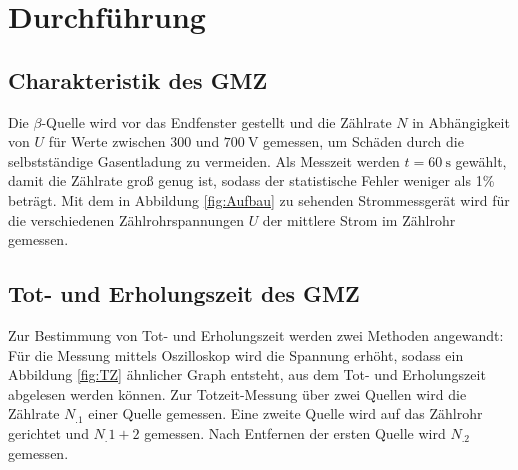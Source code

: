 \section{Durchführung}
\label{sec:Durchführung}

\subsection{Charakteristik des GMZ}
Die $\beta$-Quelle wird vor das Endfenster gestellt und die Zählrate $N$ in Abhängigkeit von $U$ für Werte zwischen $300$ und $\SI{700}{\volt}$ gemessen, um Schäden durch die selbstständige Gasentladung zu vermeiden. Als Messzeit werden $t=\SI{60}{\second}$ gewählt, damit die Zählrate groß genug ist, sodass der statistische Fehler weniger als 1\% beträgt.
Mit dem in Abbildung \ref{fig:Aufbau} zu sehenden Strommessgerät wird für die verschiedenen Zählrohrspannungen $U$ der mittlere Strom im Zählrohr gemessen.

\subsection{Tot- und Erholungszeit des GMZ}
Zur Bestimmung von Tot- und Erholungszeit werden zwei Methoden angewandt:
Für die Messung mittels Oszilloskop wird die Spannung erhöht, sodass ein Abbildung \ref{fig:TZ} ähnlicher Graph entsteht, aus dem Tot- und Erholungszeit abgelesen werden können.
\newline\newline
Zur Totzeit-Messung über zwei Quellen wird die Zählrate $N_.1$ einer Quelle gemessen.
Eine zweite Quelle wird auf das Zählrohr gerichtet und $N_.{1+2}$ gemessen.
Nach Entfernen der ersten Quelle wird $N_.2$ gemessen.
